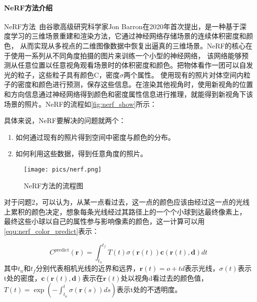 \paragraph{NeRF方法介绍}
NeRF方法~\cite{mildenhall2021nerf}由谷歌高级研究科学家Jon Barron在2020年首次提出，是一种基于深度学习的三维场景重建和渲染方法，它通过神经网络存储场景的连续体积密度和颜色，
从而实现从多视点的二维图像数据中恢复出逼真的三维场景。NeRF的核心在于使用一系列从不同角度拍摄的图片来训练一个小型的神经网络，
该网络能够预测从任意位置以任意视角观看场景时的体积密度和颜色。把物体看作一团可以自发光的粒子，这些粒子具有颜色C，密度$\sigma$两个属性。
使用现有的照片对体空间内粒子的密度和颜色进行预测，保存这些信息。在渲染其他视角时，使用新视角的位置和方向信息通过神经网络得到颜色和密度属性信息进行推理，就能得到新视角下该场景的照片。NeRF的流程如\autoref{fig:nerf_show}所示：
\par 具体来说，NeRF要解决的问题就两个：
\begin{enumerate}
    \item 如何通过现有的照片得到空间中密度与颜色的分布。
    \item 如何利用这些数据，得到任意角度的照片。
\end{enumerate}
\begin{figure}[htbp]
    \centering
    \texttt{[image: pics/nerf.png]}
    \caption{\label{fig:nerf_show}NeRF方法的流程图}
\end{figure}



对于问题2，可以认为，从某一点看过去，这一点的颜色应该由经过这一点的光线上累积的颜色决定，想象每条光线经过其路径上的一个个小球到达最终像素上，
最终这些小球以自己的属性参与影响像素的颜色，这一计算可以用\autoref{equ:nerf_color_predict}表示：

\begin{equation}
    \label{equ:nerf_color_predict}
    C^{p\text{redict}}(\mathbf{r})=\int_{t_n}^{t_f}T(t)\sigma(\mathbf{r}(t))\mathbf{c}(\mathbf{r}(t),\mathbf{d})dt
\end{equation}
其中$t_n$和$t_f$分别代表相机光线的近界和远界，$\mathbf{r}(t)=o+td$表示光线，$\sigma(t)$表示t处的密度，$\mathbf{c}(\mathbf{r}(t),\mathbf{d})$表示在$\mathbf{r}(t)$处以视角d看过去的颜色值，
$T(t)=\exp{(-\int_{t_n}^t\sigma(\mathbf{r}(s))ds)}$表示t处的不透明度。


